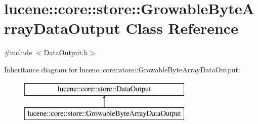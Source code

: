 \hypertarget{classlucene_1_1core_1_1store_1_1GrowableByteArrayDataOutput}{}\section{lucene\+:\+:core\+:\+:store\+:\+:Growable\+Byte\+Array\+Data\+Output Class Reference}
\label{classlucene_1_1core_1_1store_1_1GrowableByteArrayDataOutput}


{\ttfamily \#include $<$Data\+Output.\+h$>$}

Inheritance diagram for lucene\+:\+:core\+:\+:store\+:\+:Growable\+Byte\+Array\+Data\+Output\+:\begin{figure}[H]
\begin{center}
\leavevmode
\includegraphics[height=2.000000cm]{classlucene_1_1core_1_1store_1_1GrowableByteArrayDataOutput}
\end{center}
\end{figure}
